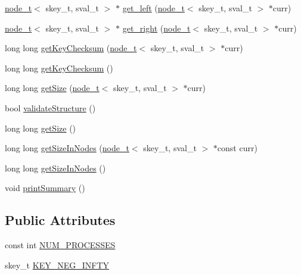 \begin{DoxyCompactItemize}
\item 
\hyperlink{structnode__t}{node\+\_\+t}$<$ skey\+\_\+t, sval\+\_\+t $>$ $\ast$ \hyperlink{classccavl_a3a0b0d9511f6c33a366df29b7e5e78c6}{get\+\_\+left} (\hyperlink{structnode__t}{node\+\_\+t}$<$ skey\+\_\+t, sval\+\_\+t $>$ $\ast$curr)
\item 
\hyperlink{structnode__t}{node\+\_\+t}$<$ skey\+\_\+t, sval\+\_\+t $>$ $\ast$ \hyperlink{classccavl_adea629204a5f01be8cf538a84a82cbe0}{get\+\_\+right} (\hyperlink{structnode__t}{node\+\_\+t}$<$ skey\+\_\+t, sval\+\_\+t $>$ $\ast$curr)
\item 
long long \hyperlink{classccavl_a8722026efe4a180eefd9fd5a535b8930}{get\+Key\+Checksum} (\hyperlink{structnode__t}{node\+\_\+t}$<$ skey\+\_\+t, sval\+\_\+t $>$ $\ast$curr)
\item 
long long \hyperlink{classccavl_aad58da3e9edfdc382a5dc434505e1ba0}{get\+Key\+Checksum} ()
\item 
long long \hyperlink{classccavl_a6777e1819dbd5db66a28d859b01d147e}{get\+Size} (\hyperlink{structnode__t}{node\+\_\+t}$<$ skey\+\_\+t, sval\+\_\+t $>$ $\ast$curr)
\item 
bool \hyperlink{classccavl_ac47877ab6e5def2750f5df5cda2c19be}{validate\+Structure} ()
\item 
long long \hyperlink{classccavl_a0cba7a4d7634b04f0029d612d8ed2e0e}{get\+Size} ()
\item 
long long \hyperlink{classccavl_ac537ecd0a2f9ab354d3e552da16c7b2a}{get\+Size\+In\+Nodes} (\hyperlink{structnode__t}{node\+\_\+t}$<$ skey\+\_\+t, sval\+\_\+t $>$ $\ast$const curr)
\item 
long long \hyperlink{classccavl_a3436a535b92e8199212b297d80c4ae6e}{get\+Size\+In\+Nodes} ()
\item 
void \hyperlink{classccavl_a3ab44e9335cff25b627abb847477438c}{print\+Summary} ()
\end{DoxyCompactItemize}
\subsection*{Public Attributes}
\begin{DoxyCompactItemize}
\item 
const int \hyperlink{classccavl_a8ccf65d91ffe06b1365ddf88e4a7c40a}{N\+U\+M\+\_\+\+P\+R\+O\+C\+E\+S\+S\+ES}
\item 
skey\+\_\+t \hyperlink{classccavl_ae7c30fe784d924a824eb95fc9a1536df}{K\+E\+Y\+\_\+\+N\+E\+G\+\_\+\+I\+N\+F\+TY}
\end{DoxyCompactItemize}


